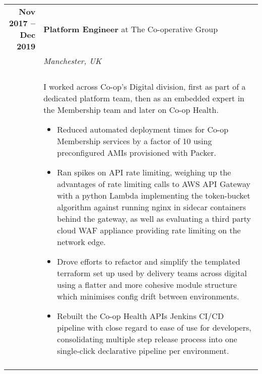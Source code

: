\documentclass[a4paper,10pt]{article} %
\begin{document}
\begin{tabularx}{\textwidth}{r|X}
\textbf{Nov 2017 -- Dec 2019}       & \textbf{Platform Engineer} at The Co-operative Group \\
                                    & \emph{Manchester, UK} \\
                                    & \\
                                    & \footnotesize
    {I worked across Co-op's Digital division, first as part of a dedicated
        platform team, then as an embedded expert in the Membership team and
        later on Co-op Health.
    \begin{itemize}
    \item Reduced automated deployment times for Co-op Membership services by a
        factor of 10 using preconfigured AMIs provisioned with Packer.
    \item Ran spikes on API rate limiting, weighing up the advantages of rate
        limiting calls to AWS API Gateway with a python Lambda implementing the
        token-bucket algorithm against running nginx in sidecar containers
        behind the gateway, as well as evaluating a third party cloud WAF
        appliance providing rate limiting on the network edge.
    \item Drove efforts to refactor and simplify the templated terraform set up
        used by delivery teams across digital using a flatter and more cohesive
        module structure which minimises config drift between environments.
    \item Rebuilt the Co-op Health APIs Jenkins CI/CD pipeline with close
        regard to ease of use for developers, consolidating multiple step
        release process into one single-click declarative pipeline per
        environment.
    \end{itemize}}\\

\multicolumn{2}{r}{} \\ %


\end{tabularx}
\end{document}
